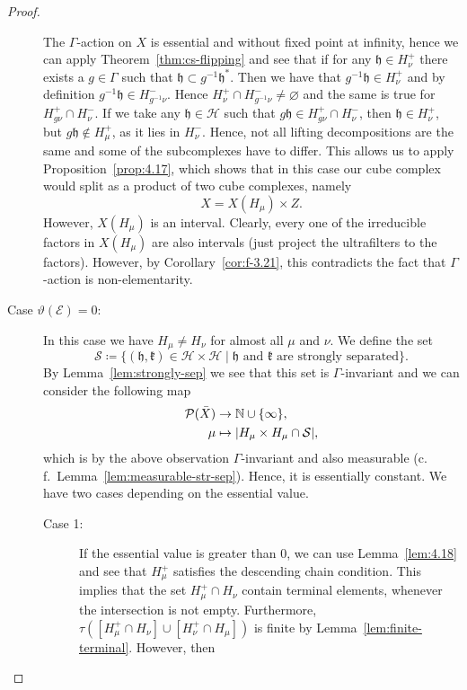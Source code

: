 \begin{proof}
\begin{description}
    The \(\Gamma\)-action on \(X\) is essential and without fixed point at infinity, hence we can apply Theorem~\ref{thm:cs-flipping} and see that if for any \(\mathfrak{h} \in H_{\nu}^+\) there exists a \(g \in \Gamma\) such that \(\mathfrak{h} \subset g^{-1}\mathfrak{h}^\ast \). Then we have that \(g^{-1}\mathfrak{h} \in H_\nu^+\) and by definition \(g^{-1} \mathfrak{h} \in H_{g^{-1}\nu}^-\). Hence \(H_\nu^+ \cap H_{g^{-1}\nu}^- \neq \varnothing\) and the same is true for \(H_{g\nu}^+ \cap H_{\nu}^-\). If we take any \(\mathfrak{h} \in \mathcal{H}\) such that \(g\mathfrak{h} \in H_{g\nu}^+ \cap H_\nu^-\), then \(\mathfrak{h} \in H_{\nu}^+\), but \(g\mathfrak{h} \not \in H_\mu^+\), as it lies in \(H_\nu^-\). Hence, not all lifting decompositions are the same and some of the subcomplexes have to differ. This allows us to apply Proposition~\ref{prop:4.17}, which shows that in this case our cube complex would split as a product of two cube complexes, namely
    \[
      X = X(H_\mu) \times Z.
    \]
    However, \(X(H_\mu)\) is an interval. Clearly, every one of the irreducible factors in \(X(H_\mu)\) are also intervals (just project the ultrafilters to the factors). However, by Corollary~\ref{cor:f-3.21}, this contradicts the fact that \(\Gamma\)-action is non-elementarity.
  \item[Case \(\vartheta(\mathcal{E})=0\):] In this case we have \(H_\mu \neq H_\nu\) for almost all \(\mu\) and \(\nu\). We define the set
    \[
      \mathcal{S} \coloneqq \{(\mathfrak{h}, \mathfrak{k}) \in \mathcal{H} \times \mathcal{H} \mid \mathfrak{h} \text{ and } \mathfrak{k} \text{ are strongly separated}\}.
    \]
    By Lemma~\ref{lem:strongly-sep} we see that this set is \(\Gamma\)-invariant and we can consider the following map
    \begin{align*}
      \mathcal{P}(\bar X) &\to \mathbb{N} \cup \{\infty\},\\
      \mu &\mapsto |H_\mu \times H_\mu \cap \mathcal{S}|,
    \end{align*}
    which is by the above observation \(\Gamma\)-invariant and also measurable (c.\,f.\ Lemma~\ref{lem:measurable-str-sep}). Hence, it is essentially constant. We have two cases depending on the essential value.
    \begin{description}
    \item[Case 1:] If the essential value is greater than 0, we can use Lemma~\ref{lem:4.18} and see that \(H_\mu^+\) satisfies the descending chain condition. This implies that the set \(H_\mu^+ \cap H_\nu\) contain terminal elements, whenever the intersection is not empty. Furthermore, \(\tau([H_\mu^+ \cap H_\nu] \cup [H_\nu^+ \cap H_\mu])\) is finite by Lemma~\ref{lem:finite-terminal}. However, then

\end{description}
\end{description}
\end{proof}
